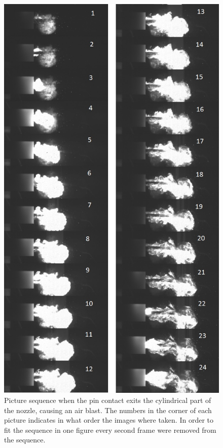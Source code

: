 \documentclass[10pt,b5paper,twoside]{article}
\begin{document}
\setcounter{table}{0}
\makeatletter 
\renewcommand{\thetable}{A.\@arabic\c@table}
\makeatother
\begin{figure}[H]
\centering
\includegraphics[scale=0.475, angle =0 ]{Bilder/Results/selfBlast.jpg}
\caption{Picture sequence when the pin contact exits the cylindrical part of the nozzle, causing an air blast. The numbers in the corner of each picture indicates in what order the images where taken. In order to fit the sequence in one figure every second frame were removed from the sequence.} \label{fig:selfBlast_seq}
\end{figure}
\end{document}
